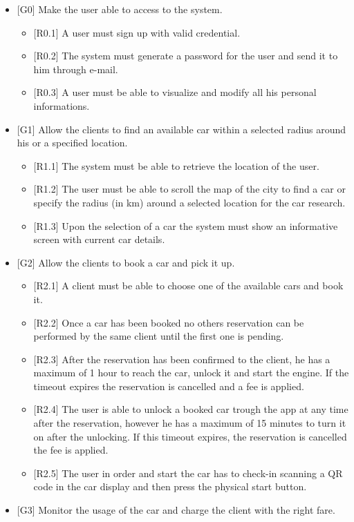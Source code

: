 \documentclass[]{article}
\providecommand{\tightlist}{%
  \setlength{\itemsep}{0pt}\setlength{\parskip}{0pt}}
\begin{document}
\begin{itemize}
\item
  {[}G0{]} Make the user able to access to the system.

  \begin{itemize}
  \tightlist
  \item
    {[}R0.1{]} A user must sign up with valid credential.
  \item
    {[}R0.2{]} The system must generate a password for the user and send
    it to him through e-mail.
  \item
    {[}R0.3{]} A user must be able to visualize and modify all his
    personal informations.
  \end{itemize}
\item
  {[}G1{]} Allow the clients to find an available car within a selected
  radius around his or a specified location.

  \begin{itemize}
  \tightlist
  \item
    {[}R1.1{]} The system must be able to retrieve the location of the
    user.
  \item
    {[}R1.2{]} The user must be able to scroll the map of the city to
    find a car or specify the radius (in km) around a selected location
    for the car research.
  \item
    {[}R1.3{]} Upon the selection of a car the system must show an
    informative screen with current car details.
  \end{itemize}
\item
  {[}G2{]} Allow the clients to book a car and pick it up.

  \begin{itemize}
  \tightlist
  \item
    {[}R2.1{]} A client must be able to choose one of the available cars
    and book it.
  \item
    {[}R2.2{]} Once a car has been booked no others reservation can be
    performed by the same client until the first one is pending.
  \item
    {[}R2.3{]} After the reservation has been confirmed to the client,
    he has a maximum of 1 hour to reach the car, unlock it and start the
    engine. If the timeout expires the reservation is cancelled and a
    fee is applied.
  \item
    {[}R2.4{]} The user is able to unlock a booked car trough the app at
    any time after the reservation, however he has a maximum of 15
    minutes to turn it on after the unlocking. If this timeout expires,
    the reservation is cancelled the fee is applied.
  \item
    {[}R2.5{]} The user in order and start the car has to check-in
    scanning a QR code in the car display and then press the physical
    start button.
  \end{itemize}
\item
  {[}G3{]} Monitor the usage of the car and charge the client with the
  right fare.


\end{itemize}
\end{document}
